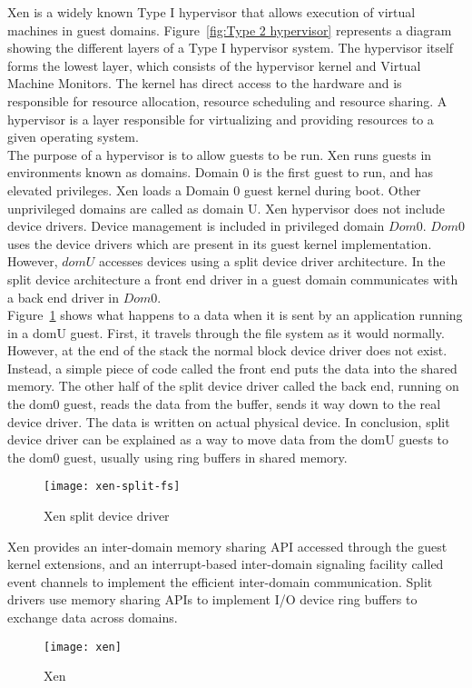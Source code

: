 Xen\cite{Barham:2003:XAV:1165389.945462} is a widely known Type I hypervisor that allows execution of virtual machines in guest domains\cite{King_operatingsystem}. Figure~\ref{fig:Type 2 hypervisor} represents a diagram showing the different layers of a Type I hypervisor system. The hypervisor itself forms the lowest layer, which consists of the hypervisor kernel and Virtual Machine Monitors. The kernel has direct access to the hardware and is responsible for resource allocation, resource scheduling and resource sharing. A hypervisor is a layer responsible for virtualizing and providing resources to a given operating system.
\\
The purpose of a hypervisor is to allow guests to be run. Xen runs guests in environments known as domains. Domain 0 is the first guest to run, and has elevated privileges. Xen loads a Domain 0 guest kernel during boot. Other unprivileged domains are called as domain U. Xen hypervisor does not include device drivers. Device management is included in privileged domain $Dom 0$. $Dom 0$ uses the device drivers which are present in its guest kernel implementation. However, $dom U$ accesses devices using a split device driver architecture. In the split device architecture a front end driver in a guest domain communicates with a back end driver in $Dom 0$.
\\
Figure~\ref{xen-split2} shows what happens to a data when it is sent by an application running in a domU guest. First, it travels through the file system as it would normally. However, at the end of the stack the normal block device driver does not exist. Instead, a simple piece of code called the front end puts the data into the shared memory. The other half of the split device driver called the back end, running on the dom0 guest, reads the data from the buffer, sends it way down to the real device driver. The data is written on actual physical device. In conclusion, split device driver can be explained as a way to move data from the domU guests to the dom0 guest, usually using ring buffers in shared memory\cite{Chisnall:2007:DGX:1407351}.
\begin{figure}[!h]
\centering
\texttt{[image: xen-split-fs]}
\caption{Xen split device driver}
\label{xen-split2}
\end{figure}

Xen provides an inter-domain memory sharing API accessed through the guest kernel extensions, and an interrupt-based inter-domain signaling facility called event channels to implement the efficient inter-domain communication. Split drivers use memory sharing APIs to implement I/O device ring buffers to exchange data across domains.
\\
\begin{figure}[!h]
\centering
\texttt{[image: xen]}
\caption{Xen}
\label{xen}
\end{figure}

